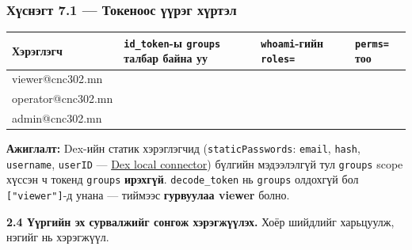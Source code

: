 \begin{Shaded}
\begin{Highlighting}[]
 \KeywordTok{;} 
    
  \VariableTok{$(}  \KeywordTok{\textbackslash{}}
      \KeywordTok{|} 
\end{Highlighting}
\end{Shaded}

\hypertarget{ux445ux4afux441ux43dux44dux433ux442-7.1-ux442ux43eux43aux435ux43dux43eux43eux441-ux4afux4afux440ux44dux433-ux445ux4afux440ux442ux44dux43b}{%
\subsubsection{Хүснэгт 7.1 --- Токеноос үүрэг хүртэл}\label{ux445ux4afux441ux43dux44dux433ux442-7.1-ux442ux43eux43aux435ux43dux43eux43eux441-ux4afux4afux440ux44dux433-ux445ux4afux440ux442ux44dux43b}}

\begingroup\scriptsize\begin{longtable}[]{@{}llll@{}}
\toprule
Хэрэглэгч & \texttt{id\_token}-ы \texttt{groups} талбар байна уу & \texttt{whoami}-гийн \texttt{roles=} & \texttt{perms=} тоо\tabularnewline
\midrule
\endhead
viewer@cnc302.mn & & &\tabularnewline
operator@cnc302.mn & & &\tabularnewline
admin@cnc302.mn & & &\tabularnewline
\bottomrule
\end{longtable}\endgroup

\textbf{Ажиглалт:} Dex-ийн статик хэрэглэгчид (\texttt{staticPasswords}: \texttt{email}, \texttt{hash}, \texttt{username}, \texttt{userID} --- \href{https://dexidp.io/docs/connectors/local/}{Dex local connector}) бүлгийн мэдээлэлгүй тул \texttt{groups} scope хүссэн ч токенд \texttt{groups} \textbf{ирэхгүй}. \texttt{decode\_token} нь \texttt{groups} олдохгүй бол \texttt{{[}"viewer"{]}}-д унана --- тиймээс \textbf{гурвуулаа viewer} болно.

\textbf{2.4 Үүргийн эх сурвалжийг сонгож хэрэгжүүлэх.} Хоёр шийдлийг харьцуулж, нэгийг нь хэрэгжүүл.

